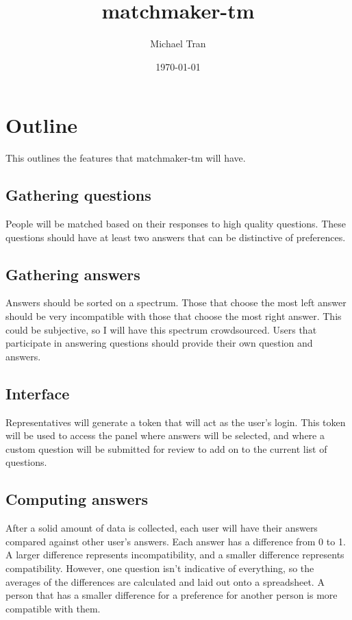 \documentclass[12pt]{article}
\title{matchmaker-tm}
\author{Michael Tran}
\date{\today}
\begin{document}
\maketitle

\section{Outline}

This outlines the features that matchmaker-tm will have.

\subsection{Gathering questions}
People will be matched based on their responses to high quality questions. These
questions should have at least two answers that can be distinctive of
preferences.

\subsection{Gathering answers}
Answers should be sorted on a spectrum. Those that choose the most left answer
should be very incompatible with those that choose the most right answer. This
could be subjective, so I will have this spectrum crowdsourced. Users that
participate in answering questions should provide their own question and
answers.

\subsection{Interface}
Representatives will generate a token that will act as the user's login. This
token will be used to access the panel where answers will be selected, and where
a custom question will be submitted for review to add on to the current list of
questions.

\subsection{Computing answers}
After a solid amount of data is collected, each user will have their answers
compared against other user's answers. Each answer has a difference from 0 to 1.
A larger difference represents incompatibility, and a smaller difference
represents compatibility. However, one question isn't indicative of everything,
so the averages of the differences are calculated and laid out onto a
spreadsheet. A person that has a smaller difference for a preference for another 
person is more compatible with them.
\end{document}

